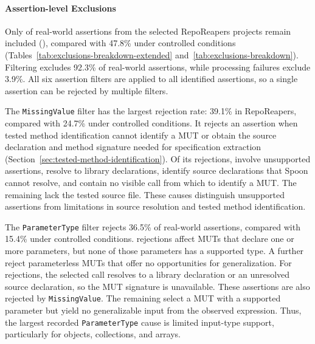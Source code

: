


\paragraph{Assertion-level Exclusions}%
\label{par:real-world-assertion-exclusions}

Only \TzRealworldAssertionsIncluded{} of \TzRealworldAssertionsTotal{} real-world assertions
from the selected RepoReapers projects remain included (\TzRealworldAssertionsIncludedPct{}),
compared with 47.8\% under controlled conditions (Tables~\ref{tab:exclusions-breakdown-extended} and~\ref{tab:exclusions-breakdown}).
Filtering excludes 92.3\% of real-world assertions, while processing failures exclude 3.9\%.
All six assertion filters are applied to all \TzRealworldAssertionsTotal{} identified assertions,
so a single assertion can be rejected by multiple filters.

The \texttt{MissingValue} filter has the largest rejection rate: 39.1\% in RepoReapers, compared
with 24.7\% under controlled conditions. It rejects an assertion when tested method identification
cannot identify a MUT or obtain the source declaration and method signature needed for specification
extraction (Section~\ref{sec:tested-method-identification}). Of its
\TzRealworldMissingValueRejected{} rejections,
\TzRealworldMissingValueUnsupportedAssertionShape{} involve unsupported assertions,
\TzRealworldMissingValueLibraryDeclaration{} resolve to library declarations,
\TzRealworldMissingValueUnresolvedSourceDeclaration{} identify source declarations that Spoon
cannot resolve, and \TzRealworldMissingValueNoVisibleCall{} contain no visible call from which to
identify a MUT. The remaining \TzRealworldMissingValueMissingTestedFile{} lack the tested source
file. These causes distinguish unsupported assertions from limitations in source resolution and
tested method identification.

The \texttt{ParameterType} filter rejects 36.5\% of real-world assertions, compared with 15.4\%
under controlled conditions. \TzRealworldParameterTypeUnsupportedTypes{} rejections affect MUTs
that declare one or more parameters, but none of those parameters has a supported type. A
further \TzRealworldParameterTypeZeroParameters{} reject parameterless MUTs
that offer no opportunities for generalization.
For \TzRealworldParameterTypeMissingDeclaration{} rejections,
the selected call resolves to a library declaration or an unresolved source declaration,
so the MUT signature is unavailable. These assertions are also rejected by \texttt{MissingValue}.
The remaining \TzRealworldParameterTypeDerivationGap{} select a MUT
with a supported parameter but yield no generalizable input from the observed expression.
Thus, the largest recorded \texttt{ParameterType} cause is limited input-type
support, particularly for objects, collections, and arrays.

